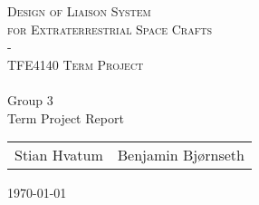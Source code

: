 \begin{titlepage}

\begin{center}


\textsc{\LARGE Design of Liaison System \\[0.1cm] for Extraterrestrial Space Crafts \\ 
- \\[0.5cm]  TFE4140 Term Project}\\[0.2cm]

\HRule \\[0.5cm]

{\huge Group 3}\\[0.2cm]
\small{Term Project Report}\\[1cm]

\begin{table}[h]
\centering
\begin{tabular}{rl}
Stian Hvatum   &  Benjamin Bjørnseth\\
\end{tabular}
\end{table}

\vfill
\large{\today}

\end{center}

\end{titlepage}
